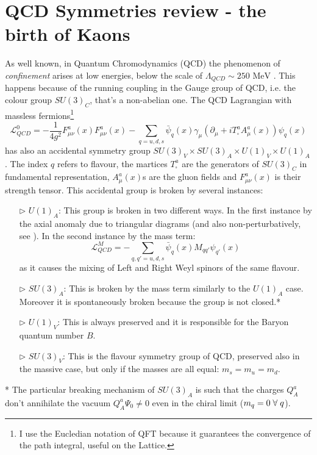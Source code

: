 \documentclass[english, LaM, oneside, noexaminfo]{sapthesis}
\newcommand{\mev}{\text{ MeV}}
\newcommand{\spc}{\hspace*{1mm}}
\begin{document}
\section{QCD Symmetries review - the birth of Kaons}
\noindent
As well known, in Quantum Chromodynamics (QCD) the phenomenon of \textit{confinement} arises at low energies, below the scale of $\Lambda_{QCD} \sim 250 \mev$ \cite{WeinbergII}.
This happens because of the running coupling in the Gauge group of QCD, i.e. the colour group $SU(3)_C$, that's a non-abelian one.
The QCD Lagrangian with massless fermions\footnote{I use the Eucledian notation of QFT because it guarantees the convergence of the path integral, useful on the Lattice.}
\begin{equation}\label{eq:masslessQCD}
    \mathcal{L}_{QCD}^0 = -\frac{1}{4g^2} F_{\mu\nu}^a(x)F_{\mu\nu}^a(x) - \sum_{q = u,d,s} \bar\psi_q (x) \gamma_\mu \left( \partial_\mu + i T^a_{\square} A_\mu^a (x) \right) \psi_q (x)
\end{equation}
has also an accidental symmetry group $SU(3)_V \times SU(3)_A \times U(1)_V \times U(1)_A$.
The index $q$ refers to flavour, the martices $T^a_{\square}$ are the generators of $SU(3)_C$ in fundamental representation, $A_\mu^a (x) $s are the gluon fields and $F_{\mu\nu}^a(x)$ is their strength tensor.
This accidental group is broken by several instances:
\begin{itemize}
    \item [$\triangleright$] $U(1)_A$: This group is broken in two different ways. In the first instance by the axial anomaly due to triangular diagrams (and also non-perturbatively, see \cite{FujikawaI}\cite{FujikawaII}).
            In the second instance by the mass term: $$\mathcal{L}_{QCD}^M = - \sum_{q,q' = u,d,s} \bar\psi_q (x) M_{qq'} \psi_{q'} (x)$$ as it causes the mixing of Left and Right Weyl spinors of the same flavour.
    \item [$\triangleright$] $SU(3)_A$: This is broken by the mass term similarly to the $U(1)_A$ case.
            Moreover it is spontaneously broken because the group is not closed.*
    \item [$\triangleright$] $U(1)_V$: This is always preserved and it is responsible for the Baryon quantum number $B$.
    \item [$\triangleright$] $SU(3)_V$: This is the flavour symmetry group of QCD, preserved also in the massive case, but only if the masses are all equal: $m_s = m_u = m_d$.
\end{itemize}
* The particular breaking mechanism of $SU(3)_A$ is such that the charges $Q^a_A$ don't annihilate the vacuum $Q^a_A \Psi_0 \ne 0$ even in the chiral limit ($m_q = 0 \spc \forall \spc q$).
\end{document}
